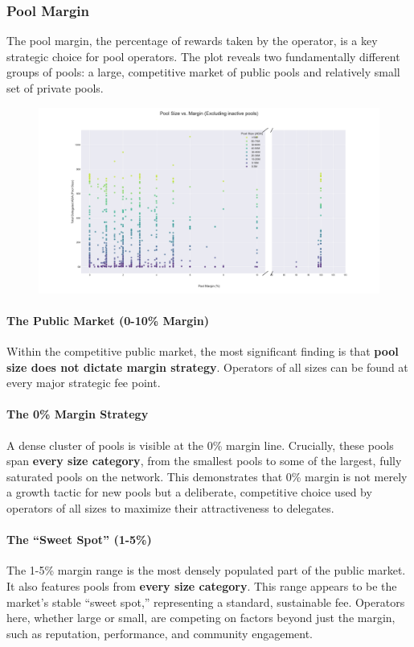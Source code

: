 \documentclass[11pt, letterpaper]{article}
\begin{document}
\subsubsection{Pool Margin}

The pool margin, the percentage of rewards taken by the operator, is a key strategic
choice for pool operators. The plot reveals two fundamentally different groups of
pools: a large, competitive market of public pools and relatively small set of private pools.

\begin{figure}[H]
	\centering
	\includegraphics[width=\textwidth]{img/pool_margin_vs_size.png}
\end{figure}

\paragraph{The Public Market (0-10\% Margin)}
Within the competitive public market, the most significant finding is that
\textbf{pool size does not dictate margin strategy}. Operators of all sizes
can be found at every major strategic fee point.

\paragraph{The 0\% Margin Strategy}
A dense cluster of pools is visible at the 0\% margin line. Crucially,
these pools span \textbf{every size category}, from the smallest pools to some of the largest,
fully saturated pools on the network. This demonstrates that 0\% margin is not merely a
growth tactic for new pools but a deliberate, competitive choice used by operators
of all sizes to maximize their attractiveness to delegates.

\paragraph{The ``Sweet Spot'' (1-5\%)}
The 1-5\% margin range is the most densely populated part of the
public market. It also features pools from \textbf{every size category}. This
range appears to be the market's stable ``sweet spot,'' representing a standard,
sustainable fee. Operators here, whether large or small, are competing on
factors beyond just the margin, such as reputation, performance, and
community engagement.
\end{document}
